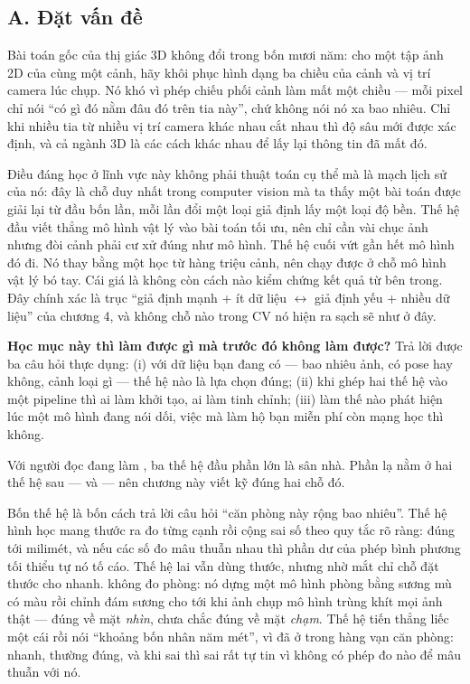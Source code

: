 \documentclass[../../../deep_learning.tex]{subfiles}
\begin{document}
\subsection{A. Đặt vấn đề}
Bài toán gốc của thị giác 3D không đổi trong bốn mươi năm: cho một tập ảnh 2D của cùng một cảnh, hãy khôi phục hình dạng ba chiều của cảnh và vị trí camera lúc chụp. Nó khó vì phép chiếu phối cảnh làm mất một chiều --- mỗi pixel chỉ nói ``có gì đó nằm đâu đó trên tia này'', chứ không nói nó xa bao nhiêu. Chỉ khi nhiều tia từ nhiều vị trí camera khác nhau cắt nhau thì độ sâu mới được xác định, và cả ngành 3D là các cách khác nhau để lấy lại thông tin đã mất đó.

Điều đáng học ở lĩnh vực này không phải thuật toán cụ thể mà là mạch lịch sử của nó: đây là chỗ duy nhất trong computer vision mà ta thấy một bài toán được giải lại từ đầu bốn lần, mỗi lần đổi một loại giả định lấy một loại độ bền. Thế hệ đầu viết thẳng mô hình vật lý vào bài toán tối ưu, nên chỉ cần vài chục ảnh nhưng đòi cảnh phải cư xử đúng như mô hình. Thế hệ cuối vứt gần hết mô hình đó đi. Nó thay bằng một  học từ hàng triệu cảnh, nên chạy được ở chỗ mô hình vật lý bó tay. Cái giá là không còn cách nào kiểm chứng kết quả từ bên trong. Đây chính xác là trục ``giả định mạnh + ít dữ liệu \(\leftrightarrow\) giả định yếu + nhiều dữ liệu'' của chương 4, và không chỗ nào trong CV nó hiện ra sạch sẽ như ở đây.

\textbf{Học mục này thì làm được gì mà trước đó không làm được?} Trả lời được ba câu hỏi thực dụng: (i) với dữ liệu bạn đang có --- bao nhiêu ảnh, có pose hay không, cảnh loại gì --- thế hệ nào là lựa chọn đúng; (ii) khi ghép hai thế hệ vào một pipeline thì ai làm khởi tạo, ai làm tinh chỉnh; (iii) làm thế nào phát hiện lúc một mô hình  đang nói dối, việc mà  làm hộ bạn miễn phí còn mạng học thì không.

Với người đọc đang làm , ba thế hệ đầu phần lớn là sân nhà. Phần lạ nằm ở hai thế hệ sau ---  và  --- nên chương này viết kỹ đúng hai chỗ đó.

\begin{trucgiac}
Bốn thế hệ là bốn cách trả lời câu hỏi ``căn phòng này rộng bao nhiêu''. Thế hệ hình học mang thước ra đo từng cạnh rồi cộng sai số theo quy tắc rõ ràng: đúng tới milimét, và nếu các số đo mâu thuẫn nhau thì phần dư của phép bình phương tối thiểu tự nó tố cáo. Thế hệ lai vẫn dùng thước, nhưng nhờ mắt chỉ chỗ đặt thước cho nhanh.  không đo phòng: nó dựng một mô hình phòng bằng sương mù có màu rồi chỉnh đám sương cho tới khi ảnh chụp mô hình trùng khít mọi ảnh thật --- đúng về mặt \emph{nhìn}, chưa chắc đúng về mặt \emph{chạm}. Thế hệ tiến thẳng liếc một cái rồi nói ``khoảng bốn nhân năm mét'', vì đã ở trong hàng vạn căn phòng: nhanh, thường đúng, và khi sai thì sai rất tự tin vì không có phép đo nào để mâu thuẫn với nó.
\end{trucgiac}
\end{document}
